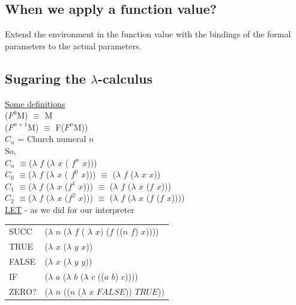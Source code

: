 \documentclass{article}
\begin{document}
\begin{flushleft}
\section{When we apply a function value?}
\begin{flushleft}
 Extend the environment in the function value with the bindings of the formal parameters to the actual parameters.
\end{flushleft}
\subsection{Sugaring the $\lambda$-calculus}
\begin{flushleft}
 \underline{Some definitions}\\
 ($F^{0}$M)  $\equiv$ M\\
 ($F^{n+1}$M)  $\equiv$ F($F^{n}$M))\\
 \bigskip
 $C_n$ = Church numeral $\mathit{n}$\\
 \bigskip
 So,\\
 $C_n$ $\equiv$($\lambda$ $\mathit{f}$ ($\lambda$  $\mathit{x}$  ( $f^{n}$  $\mathit{x}$)))\\
 $C_0$ $\equiv$($\lambda$ $\mathit{f}$ ($\lambda$  $\mathit{x}$  ( $f^{0}$  $\mathit{x}$)))  $\equiv$ ($\lambda$ $\mathit{f}$ ($\lambda$  $\mathit{x}$   $\mathit{x}$))\\
 $C_1$ $\equiv$($\lambda$ $\mathit{f}$ ($\lambda$  $\mathit{x}$  ($f^{1}$  $\mathit{x}$)))  $\equiv$ ($\lambda$ $\mathit{f}$ ($\lambda$  $\mathit{x}$  ($\mathit{f}$  $\mathit{x}$)))\\
 $C_2$ $\equiv$($\lambda$ $\mathit{f}$ ($\lambda$  $\mathit{x}$  ($f^{2}$  $\mathit{x}$)))  $\equiv$ ($\lambda$ $\mathit{f}$ ($\lambda$  $\mathit{x}$  ($\mathit{f}$ ($\mathit{f}$  $\mathit{x}$))))\\
 \bigskip
 \underline{LET} - as we did for our interpreter\\
 \begin{tabular}{l l}
  SUCC & ($\lambda$ $\mathit{n}$ ($\lambda$ $\mathit{f}$ ( $\lambda$ $\mathit{x}$) ($\mathit{f}$ (($\mathit{n}$ $\mathit{f}$) $\mathit{x}$))))\\
  TRUE & ($\lambda$ $\mathit{x}$ ($\lambda$ $\mathit{y}$ $\mathit{x}$))\\
  FALSE & ($\lambda$ $\mathit{x}$ ($\lambda$ $\mathit{y}$ $\mathit{y}$))\\
  IF & ($\lambda$ $\mathit{a}$ ($\lambda$ $\mathit{b}$ ($\lambda$ $\mathit{c}$ (($\mathit{a}$ $\mathit{b}$) $\mathit{c}$))))\\
  ZERO? & ($\lambda$ $\mathit{n}$ (($\mathit{n}$ ($\lambda$ $\mathit{x}$ $\mathit{FALSE}$)) $\mathit{TRUE}$))\\
 \end{tabular}
 \end{flushleft}

\end{flushleft}
\end{document}
